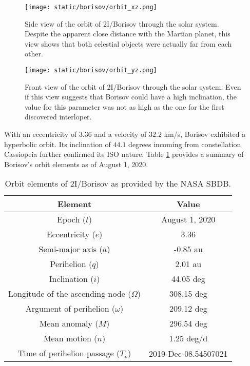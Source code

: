\begin{figure}[H]
  \centering
  \texttt{[image: static/borisov/orbit\_xz.png]}
  \caption[Side view of the orbit of 2I/Borisov through the solar system]{
    Side view of the orbit of 2I/Borisov through the solar system. Despite the
        apparent close distance with the Martian planet, this view shows that both
        celestial objects were actually far from each other.}
  \label{fig:borisov_orbit_xz}
\end{figure}

\begin{figure}[H]
  \centering
  \texttt{[image: static/borisov/orbit\_yz.png]}
  \caption[Front view of the orbit of 2I/Borisov through the solar system]{
    Front view of the orbit of 2I/Borisov through the solar system. Even if this
    view suggests that Borisov could have a high inclination, the value for this
    parameter was not as high as the one for the first discovered interloper.}
  \label{fig:borisov_orbit_yz}
\end{figure}

With an eccentricity of $3.36$ and a velocity of $32.2$ km/s, Borisov exhibited
a hyperbolic orbit. Its inclination of $44.1$ degrees incoming from
constellation Cassiopeia further confirmed its ISO nature. Table
\ref{tab:borisov_elements} provides a summary of Borisov's orbit elements as of
August 1, 2020.

\begin{table}[H]
  \centering
  \begin{tabular}{|c|c|}
    \hline
    Element & Value \\
    \hline
    Epoch ($t$) & August 1, 2020 \\
    Eccentricity ($e$) & 3.36 \\
    Semi-major axis ($a$) & -0.85 au \\
    Perihelion ($q$) & 2.01 au \\
    Inclination ($i$) & 44.05 deg \\
    Longitude of the ascending node ($\Omega$) & 308.15 deg \\
    Argument of perihelion ($\omega$) & 209.12 deg \\
    Mean anomaly ($M$) & 296.54 deg \\
    Mean motion ($n$) & 1.25 deg/d \\
    Time of perihelion passage ($T_p$) & 2019-Dec-08.54507021 \\
    \hline
  \end{tabular}
  \caption{Orbit elements of 2I/Borisov as provided by the NASA SBDB.}
  \label{tab:borisov_elements}
\end{table}

